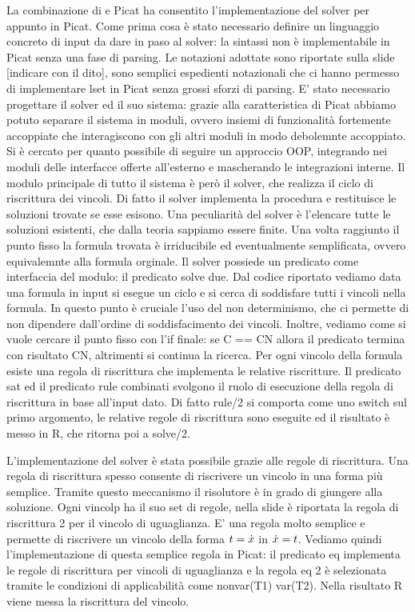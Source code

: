 \documentclass[11pt]{article}
\begin{document}
La combinazione di \lset{} e Picat ha consentito l'implementazione del
solver per \lset{} appunto in Picat. Come prima cosa è stato
necessario definire un linguaggio concreto di input da dare in paso al
solver: la sintassi \lset{} non è implementabile in Picat senza una
fase di parsing. Le notazioni adottate sono riportate sulla slide
[indicare con il dito], sono semplici espedienti notazionali che ci
hanno permesso di implementare lset in Picat senza grossi sforzi di
parsing. E' stato necessario progettare il solver ed il suo sistema:
grazie alla caratteristica di Picat abbiamo potuto separare il sistema
in moduli, ovvero insiemi di funzionalità fortemente accoppiate che
interagiscono con gli altri moduli in modo debolemnte accoppiato. Si è
cercato per quanto possibile di seguire un approccio OOP, integrando
nei moduli delle interfacce offerte all'esterno e mascherando le
integrazioni interne. Il modulo principale di tutto il sistema è però
il solver, che realizza il ciclo di riscrittura dei vincoli. Di fatto
il solver implementa la procedura \satset{} e restituisce le soluzioni
trovate se esse esisono. Una peculiarità del solver è l'elencare tutte
le soluzioni esistenti, che dalla teoria sappiamo essere finite. Una
volta raggiunto il punto fisso la formula trovata è irriducibile ed
eventualmente semplificata, ovvero equivalemnte alla formula
orginale. Il solver possiede un predicato come interfaccia del modulo:
il predicato solve due. Dal codice riportato vediamo data una formula
in input si esegue un ciclo e si cerca di soddisfare tutti i vincoli
nella formula. In questo punto è cruciale l'uso del non determinismo,
che ci permette di non dipendere dall'ordine di soddisfacimento dei
vincoli. Inoltre, vediamo come si vuole cercare il punto fisso con
l'if finale: se C == CN allora il predicato termina con risultato CN,
altrimenti si continua la ricerca. Per ogni vincolo della formula
esiste una regola di riscrittura che implementa le relative
riscritture. Il predicato sat ed il predicato rule combinati svolgono
il ruolo di esecuzione della regola di riscrittura in base all'input
dato. Di fatto rule/2 si comporta come uno switch sul primo argomento,
le relative regole di riscrittura sono eseguite ed il risultato è
messo in R, che ritorna poi a solve/2.

L'implementazione del solver è stata possibile grazie alle regole di
riscrittura. Una regola di riscrittura spesso consente di riscrivere
un vincolo in una forma più semplice. Tramite questo meccanismo il
risolutore è in grado di giungere alla soluzione. Ogni vincolp ha il
suo set di regole, nella slide è riportata la regola di riscrittura 2
per il vincolo di uguaglianza. E' una regola molto semplice e permette
di riscrivere un vincolo della forma $t = \dot{x}$ in $\dot{x} =
t$. Vediamo quindi l'implementazione di questa semplice regola in
Picat: il predicato eq implementa le regole di riscrittura per vincoli
di uguaglianza e la regola eq 2 è selezionata tramite le condizioni di
applicabilità come nonvar(T1) var(T2). Nella risultato R viene messa
la riscrittura del vincolo.
\end{document}
